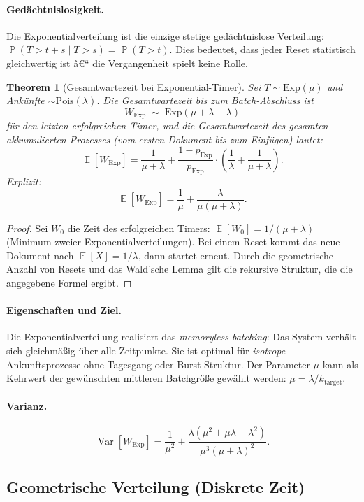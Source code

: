 ﻿\documentclass[12pt, a4paper]{article}
\newtheorem{theorem}{Theorem}[section]
\DeclareMathOperator{\E}{\mathbb{E}}
\DeclareMathOperator{\Var}{Var}
\DeclareMathOperator{\Prob}{\mathbb{P}}
\newcommand{\Exp}{\mathrm{Exp}}
\newcommand{\Pois}{\mathrm{Pois}}
\begin{document}
\paragraph{Gedächtnislosigkeit.}
Die Exponentialverteilung ist die einzige stetige gedächtnislose Verteilung:
$\Prob(T > t+s \mid T > s) = \Prob(T > t)$. Dies bedeutet, dass jeder Reset
statistisch gleichwertig ist â€“ die Vergangenheit spielt keine Rolle.

\begin{theorem}[Gesamtwartezeit bei Exponential-Timer]
\label{thm:expwait}
Sei $T \sim \Exp(\mu)$ und Ankünfte $\sim \Pois(\lambda)$.
Die Gesamtwartezeit bis zum Batch-Abschluss ist
\[
  W_{\Exp} \;\sim\; \Exp(\mu + \lambda - \lambda)
\]
für den letzten erfolgreichen Timer, und die Gesamtwartezeit des gesamten
akkumulierten Prozesses (vom ersten Dokument bis zum Einfügen) lautet:
\[
  \E[W_{\Exp}] = \frac{1}{\mu + \lambda} + \frac{1-p_{\Exp}}{p_{\Exp}} \cdot
  \left(\frac{1}{\lambda} + \frac{1}{\mu+\lambda}\right).
\]
Explizit:
\[
  \E[W_{\Exp}] = \frac{1}{\mu} + \frac{\lambda}{\mu(\mu+\lambda)}.
\]
\end{theorem}

\begin{proof}
Sei $W_0$ die Zeit des erfolgreichen Timers: $\E[W_0] = 1/(\mu+\lambda)$
(Minimum zweier Exponentialverteilungen). Bei einem Reset kommt das neue
Dokument nach $\E[X] = 1/\lambda$, dann startet erneut. Durch die geometrische
Anzahl von Resets und das Wald'sche Lemma gilt die rekursive Struktur, die die
angegebene Formel ergibt.
\end{proof}

\paragraph{Eigenschaften und Ziel.}
Die Exponentialverteilung realisiert das \emph{memoryless batching}: Das System
verhält sich gleichmäßig über alle Zeitpunkte. Sie ist optimal für
\emph{isotrope} Ankunftsprozesse ohne Tagesgang oder Burst-Struktur. Der
Parameter $\mu$ kann als Kehrwert der gewünschten mittleren Batchgröße gewählt
werden: $\mu = \lambda / k_{\mathrm{target}}$.

\paragraph{Varianz.}
\[
  \Var[W_{\Exp}] = \frac{1}{\mu^2} + \frac{\lambda(\mu^2 + \mu\lambda +
  \lambda^2)}{\mu^3(\mu+\lambda)^2}.
\]

\subsection{Geometrische Verteilung (Diskrete Zeit)}\label{subsec:geo}
\end{document}
